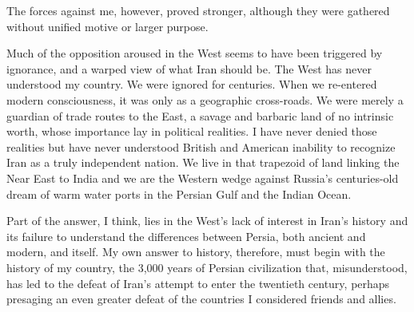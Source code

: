 The forces against me, however, proved stronger, although they were gathered without unified motive or larger purpose. 

Much of the opposition aroused in the West seems to have been triggered by ignorance, and a warped view of what Iran should be. The West has never understood my country. We were ignored for centuries. When we re-entered modern consciousness, it was only as a geographic cross-roads. We were merely a guardian of trade routes to the East, a savage and barbaric land of no intrinsic worth, whose importance lay in political realities. I have never denied those realities but have never understood British and American inability to recognize Iran as a truly independent nation. We live in that trapezoid of land linking the Near East to India and we are the Western wedge against Russia's centuries-old dream of warm water ports in the Persian Gulf and the Indian Ocean. 

Part of the answer, I think, lies in the West's lack of interest in Iran's history and its failure to understand the differences between Persia, both ancient and modern, and itself. My own answer to history, therefore, must begin with the history of my country, the 3,000 years of Persian civilization that, misunderstood, has led to the defeat of Iran's attempt to enter the twentieth century, perhaps presaging an even greater defeat of the countries I considered friends and allies. 